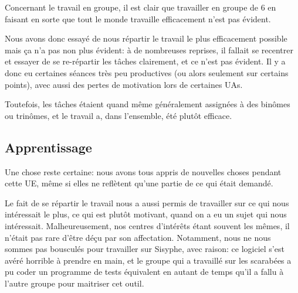 Concernant le travail en groupe, il est clair que travailler en groupe
de 6 en faisant en sorte que tout le monde travaille efficacement
n'est pas évident.

Nous avons donc essayé de nous répartir le travail le plus
efficacement possible mais ça n'a pas non plus évident: à de
nombreuses reprises, il fallait se recentrer et essayer de se
re-répartir les tâches clairement, et ce n'est pas évident.  Il y a
donc eu certaines séances très peu productives (ou alors seulement sur
certains points), avec aussi des pertes de motivation lors de certaines
UAs.

Toutefois, les tâches étaient quand même généralement assignées à des
binômes ou trinômes, et le travail a, dans l'ensemble, été plutôt
efficace.

\subsection{Apprentissage}
  Une chose reste certaine: nous avons tous appris de nouvelles choses pendant
  cette UE, même si elles ne reflètent qu'une partie de ce qui était demandé.

  Le fait de se répartir le travail nous a aussi permis de travailler sur ce
  qui nous intéressait le plus, ce qui est plutôt motivant, quand on a
  eu un sujet qui nous intéressait. Malheureusement, nos centres
  d'intérêts étant souvent les mêmes, il n'était pas rare d'être déçu
  par son affectation. Notamment, nous ne nous sommes pas bousculés
  pour travailler sur Sisyphe, avec raison: ce logiciel s'est avéré
  horrible à prendre en main, et le groupe qui a travaillé sur les
  scarabées a pu coder un programme de tests équivalent en autant de
  temps qu'il a fallu à l'autre groupe pour maitriser cet outil.
